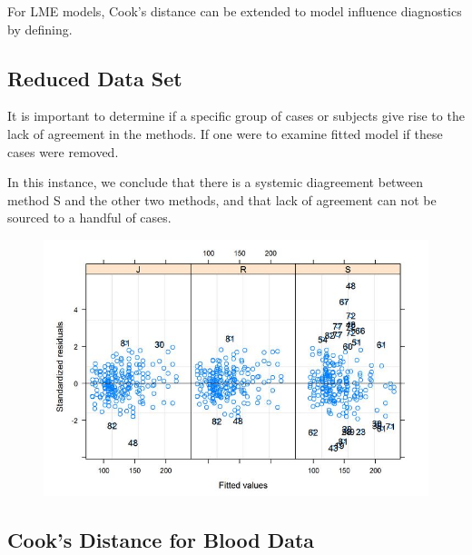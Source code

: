 \documentclass[12pt, a4paper]{report}
\theoremstyle{plain}
\theoremstyle{definition}
\theoremstyle{remark}
\begin{document}
For LME models, Cook's distance can be extended to model influence diagnostics by defining.








\subsection{Reduced Data Set}
It is important to determine if a specific group of cases or subjects give rise to the lack of agreement in the methods. If one were to examine fitted model if these cases were removed.

%	
%	

In this instance, we conclude that there is a systemic diagreement between method S and the other two methods, and that lack of agreement can not be sourced to a handful of cases.
\begin{figure}[h!]
	\centering
	\includegraphics[width=0.7\linewidth]{images/bloodnlmeResidPlot2B}
\end{figure}








\subsection{Cook's Distance for Blood Data}
\end{document}
